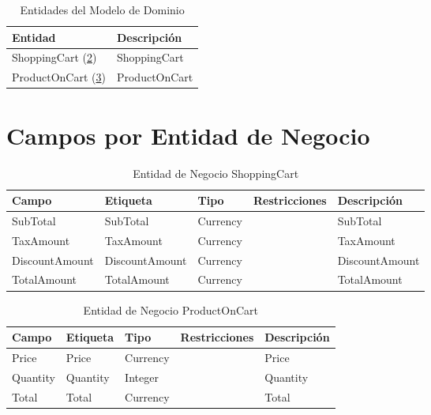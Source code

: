 \begin{table}[H]
	\caption{Entidades del Modelo de Dominio}
	\label{tab:entities}
	\begin{center}
	\begin{tabularx}{0.90\linewidth}{ X X }
		\hline
		\textbf{Entidad} & \textbf{Descripci\'on} \\
		\hline
		ShoppingCart (\ref{tab:fields-dom-ShoppingCart}) & ShoppingCart \\
		ProductOnCart (\ref{tab:fields-dom-ProductOnCart}) & ProductOnCart \\
		\hline
	\end{tabularx}
	\end{center}
\end{table}
\section{Campos por Entidad de Negocio} \label{sec:entity-fields-shoppingcart}

\begin{table}[H]
	\caption{Entidad de Negocio ShoppingCart}
	\label{tab:fields-dom-ShoppingCart}
	\begin{center}
	\begin{tabularx}{0.90\linewidth}{ X X X X X }
		\hline
		\textbf{Campo} &
		\textbf{Etiqueta} &
		\textbf{Tipo} &
		\textbf{Restricciones} &
		\textbf{Descripci\'on} \\
		\hline
		SubTotal &
		SubTotal &
		Currency &
		 &
		SubTotal \\
		TaxAmount &
		TaxAmount &
		Currency &
		 &
		TaxAmount \\
		DiscountAmount &
		DiscountAmount &
		Currency &
		 &
		DiscountAmount \\
		TotalAmount &
		TotalAmount &
		Currency &
		 &
		TotalAmount \\
		\hline
	\end{tabularx}
	\end{center}
\end{table}
\begin{table}[H]
	\caption{Entidad de Negocio ProductOnCart}
	\label{tab:fields-dom-ProductOnCart}
	\begin{center}
	\begin{tabularx}{0.90\linewidth}{ X X X X X }
		\hline
		\textbf{Campo} &
		\textbf{Etiqueta} &
		\textbf{Tipo} &
		\textbf{Restricciones} &
		\textbf{Descripci\'on} \\
		\hline
		Price &
		Price &
		Currency &
		 &
		Price \\
		Quantity &
		Quantity &
		Integer &
		 &
		Quantity \\
		Total &
		Total &
		Currency &
		 &
		Total \\
		\hline
	\end{tabularx}
	\end{center}
\end{table}
